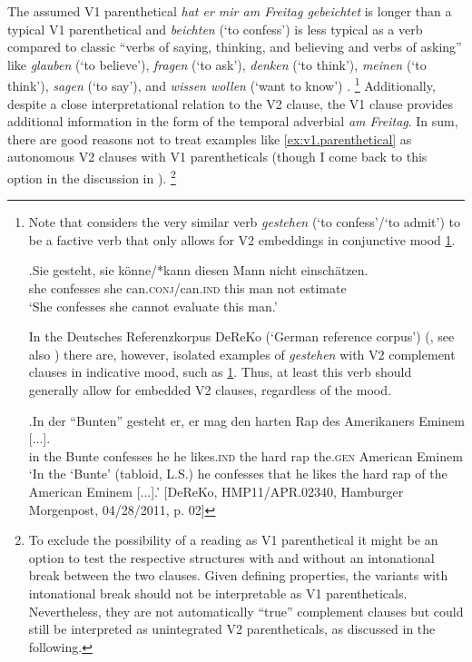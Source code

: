 The assumed V1 parenthetical \textit{hat er mir am Freitag gebeichtet} is longer than a typical V1 parenthetical  and \textit{beichten} (`to confess') is less typical as a verb compared to classic ``verbs of saying, thinking, and believing and verbs of asking''  like \textit{glauben} (`to believe'), \textit{fragen} (`to ask'), \textit{denken} (`to think'), \textit{meinen} (`to think'), \textit{sagen} (`to say'), and \textit{wissen wollen} (`want to know') \citep[56]{steinbach2007}.%
\footnote{Note that \citet[194, footnote 20]{rapp2015} considers the very similar verb \textit{gestehen} (`to confess'/`to admit') to be a factive verb that only allows for V2 embeddings in conjunctive mood \ref{ex:gestehen.conj}.

\exg.\label{ex:gestehen.conj}Sie gesteht, sie könne/*kann diesen Mann nicht einschätzen.\\
she confesses she can.\textsc{conj}/can.\textsc{ind} this man not estimate\\
`She confesses she cannot evaluate this man.' \citep[194, footnote 20, her judgment]{rapp2015}

In the Deutsches Referenzkorpus DeReKo (`German reference corpus') (\cite{dereko2022}, see also \cite{kupietz.etal2010}) there are, however, isolated examples of \textit{gestehen} with V2 complement clauses  in indicative mood, such as \ref{ex:gestehen.dereko}.
Thus, at least this verb should generally allow for embedded V2 clauses, regardless of the mood.

\exg.\label{ex:gestehen.dereko}In der ``Bunten'' gesteht er, er mag den harten Rap des Amerikaners Eminem [...].\\
in the Bunte confesses he he likes.\textsc{ind} the hard rap the.\textsc{gen} American Eminem \\
`In the `Bunte' (tabloid, L.S.) he confesses that he likes the hard rap of the American Eminem [...].' [DeReKo, HMP11/APR.02340, Hamburger Morgenpost, 04/28/2011, p. 02]
}
Additionally, despite a close interpretational relation to the V2 clause, the V1 clause provides additional information in the form of the temporal adverbial \textit{am Freitag}.
In sum, there are good reasons not to treat examples like \ref{ex:v1.parenthetical} as autonomous V2 clauses with V1 parentheticals (though I come back to this option in the discussion in ).%
\footnote{To exclude the possibility of a reading as V1 parenthetical it might be an option to test the respective structures with and without an intonational break between the two clauses.
Given  defining properties, the variants with intonational break should not be interpretable as V1 parentheticals.
Nevertheless, they are not automatically ``true'' complement clauses  but could still be interpreted as unintegrated V2 parentheticals, as discussed in the following.
}

